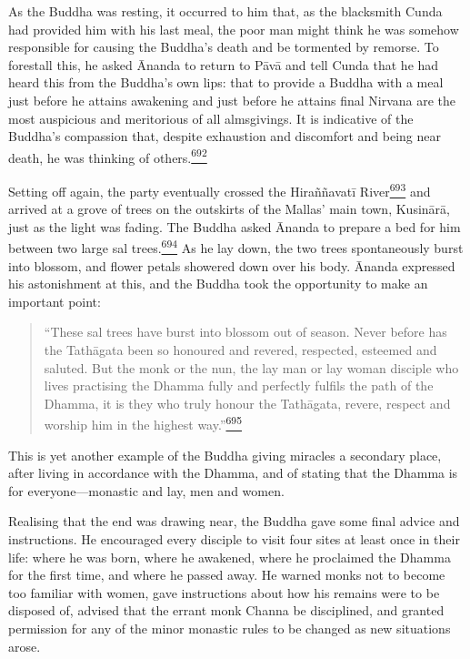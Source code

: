 As the Buddha was resting, it occurred to him that, as the blacksmith
Cunda had provided him with his last meal, the poor man might think he
was somehow responsible for causing the Buddha's death and be tormented
by remorse. To forestall this, he asked Ānanda to return to Pāvā and
tell Cunda that he had heard this from the Buddha's own lips: that to
provide a Buddha with a meal just before he attains awakening and just
before he attains final Nirvana are the most auspicious and meritorious
of all almsgivings. It is indicative of the Buddha's compassion that,
despite exhaustion and discomfort and being near death, he was thinking
of
others.\label{footprints_split_017.html_fnref692}\hyperref[footprints_split_025.htmlux5cux23fn692]{\textsuperscript{692}}

Setting off again, the party eventually crossed the Hiraññavatī
River\label{footprints_split_017.html_fnref693}\hyperref[footprints_split_025.htmlux5cux23fn693]{\textsuperscript{693}}
and arrived at a grove of trees on the outskirts of the Mallas' main
town, Kusinārā, just as the light was fading. The Buddha asked Ānanda to
prepare a bed for him between two large sal
trees.\label{footprints_split_017.html_fnref694}\hyperref[footprints_split_025.htmlux5cux23fn694]{\textsuperscript{694}}
As he lay down, the two trees spontaneously burst into blossom, and
flower petals showered down over his body. Ānanda expressed his
astonishment at this, and the Buddha took the opportunity to make an
important point:

\begin{quote}
``These sal trees have burst into blossom out of season. Never before
has the Tathāgata been so honoured and revered, respected, esteemed and
saluted. But the monk or the nun, the lay man or lay woman disciple who
lives practising the Dhamma fully and perfectly fulfils the path of the
Dhamma, it is they who truly honour the Tathāgata, revere, respect and
worship him in the highest
way.''\label{footprints_split_017.html_fnref695}\hyperref[footprints_split_025.htmlux5cux23fn695]{\textsuperscript{695}}
\end{quote}

This is yet another example of the Buddha giving miracles a secondary
place, after living in accordance with the Dhamma, and of stating that
the Dhamma is for everyone---monastic and lay, men and women.

Realising that the end was drawing near, the Buddha gave some final
advice and instructions. He encouraged every disciple to visit four
sites at least once in their life: where he was born, where he awakened,
where he proclaimed the Dhamma for the first time, and where he passed
away. He warned monks not to become too familiar with women, gave
instructions about how his remains were to be disposed of, advised that
the errant monk Channa be disciplined, and granted permission for any of
the minor monastic rules to be changed as new situations arose.

